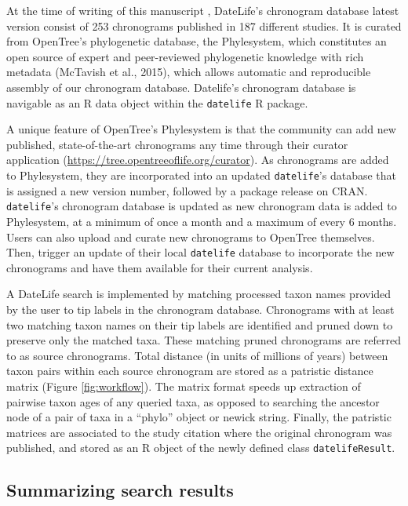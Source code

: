 \documentclass[
  english,
  man]{apa6}
\begin{document}
At the time of writing of this manuscript
,
DateLife's chronogram database latest version consist of 253 chronograms published in 187 different studies. It is curated from OpenTree's phylogenetic database, the Phylesystem, which constitutes an open source of expert and peer-reviewed phylogenetic knowledge with rich metadata (McTavish et al., 2015), which allows automatic and reproducible assembly of our chronogram database. Datelife's chronogram database is navigable as an R data object within the \texttt{datelife} R package.

A unique feature of OpenTree's Phylesystem is that the community can add new published, state-of-the-art chronograms any time through their curator application (\url{https://tree.opentreeoflife.org/curator}). As chronograms are added to Phylesystem, they are incorporated into an updated \texttt{datelife}'s database that is assigned a new version number, followed by a package release on CRAN. \texttt{datelife}'s chronogram database is updated as new chronogram data is added to Phylesystem, at a minimum of once a month and a maximum of every 6 months.
Users can also upload and curate new chronograms to OpenTree themselves. Then, trigger an update of their local \texttt{datelife} database to incorporate the new chronograms and have them available for their current analysis.

A DateLife search is implemented by matching processed taxon names provided by the user to tip labels in the chronogram database. Chronograms with at least two matching taxon names on their tip labels are identified and pruned down to preserve only the matched taxa.
These matching pruned chronograms are referred to as source chronograms.
Total distance (in units of millions of years) between taxon pairs within each source chronogram are stored as a patristic distance matrix (Figure \ref{fig:workflow}).
The matrix format speeds up extraction of pairwise taxon ages of any queried taxa, as opposed to searching the ancestor node of a pair of taxa in a ``phylo'' object or newick string.
Finally, the patristic matrices are associated to the study citation where the original chronogram was published, and stored as an R object of the newly defined class \texttt{datelifeResult}.

\hypertarget{summarizing-search-results}{%
\subsection{Summarizing search results}\label{summarizing-search-results}}
\end{document}
